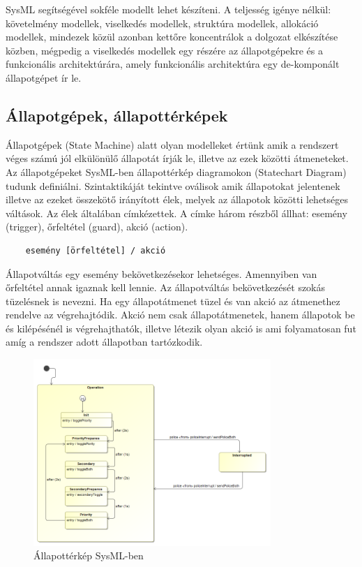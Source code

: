 SysML segítségével sokféle modellt lehet készíteni. A teljesség igénye nélkül: követelmény modellek, viselkedés modellek, struktúra modellek, allokáció modellek, mindezek közül azonban kettőre koncentrálok a dolgozat elkészítése közben, mégpedig a viselkedés modellek egy részére az állapotgépekre és a funkcionális architektúrára, amely funkcionális architektúra egy de-komponált állapotgépet ír le.



\subsection{Állapotgépek, állapottérképek}

Állapotgépek (State Machine) alatt olyan modelleket értünk amik a rendszert véges számú jól elkülönülő állapotát írják le, illetve az ezek közötti átmeneteket. Az állapotgépeket SysML-ben állapottérkép diagramokon (Statechart Diagram) tudunk definiálni. Szintaktikáját tekintve oválisok amik állapotokat jelentenek illetve az ezeket összekötő irányított élek, melyek az állapotok közötti lehetséges váltások. Az élek általában címkézettek. A címke három részből állhat: esemény (trigger), őrfeltétel (guard), akció (action).

\lstset{framesep=10pt}
\begin{lstlisting}
	esemény [örfeltétel] / akció
\end{lstlisting}
Állapotváltás egy esemény bekövetkezésekor lehetséges. Amennyiben van őrfeltétel annak igaznak kell lennie. Az állapotváltás bekövetkezését szokás tüzelésnek is nevezni. Ha egy állapotátmenet tüzel és van akció az átmenethez rendelve az végrehajtódik.
Akció nem csak állapotátmenetek, hanem állapotok be és kilépésénél is végrehajthatók, illetve létezik olyan akció is ami folyamatosan fut amíg a rendszer adott állapotban tartózkodik.

\begin{figure}[!ht]
	\centering
	\includegraphics[width=90mm, keepaspectratio]{figures/preliminaries/statechart.png}
	\caption{Állapottérkép SysML-ben}
	\label{fig:statechart}
\end{figure}

